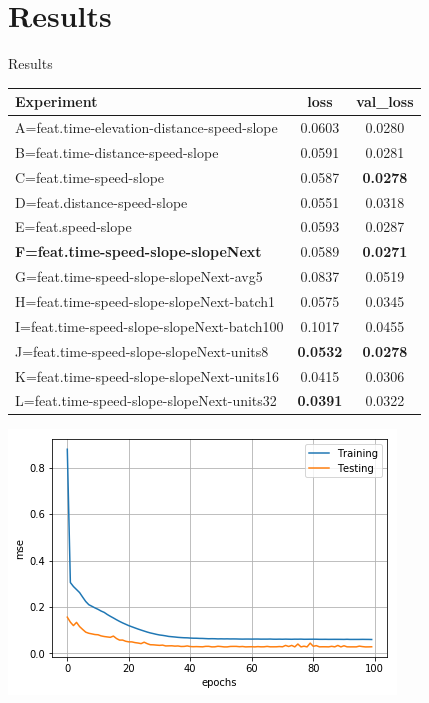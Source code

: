 \documentclass[aspectratio=169]{beamer}
\newcommand{\nologo}{\setbeamertemplate{logo}{}}
\begin{document}
\section{Results}
{\nologo
\begin{frame}{Results}
  \begin{table}[h]
    \begin{center}
      \begin{tabular}{|l||c|c|}
      \hline
      \textbf{Experiment} & \textbf{loss} & \textbf{val\_loss}\\
      \hline
      \hline
      A=feat.time-elevation-distance-speed-slope & 0.0603 & 0.0280\\
      B=feat.time-distance-speed-slope & 0.0591 & 0.0281\\
      C=feat.time-speed-slope & 0.0587 & \textbf{0.0278}\\
      D=feat.distance-speed-slope & 0.0551 & 0.0318\\
      E=feat.speed-slope & 0.0593 & 0.0287\\
      \textbf{F=feat.time-speed-slope-slopeNext} & 0.0589 & \textbf{0.0271}\\
      G=feat.time-speed-slope-slopeNext-avg5 & 0.0837 & 0.0519\\
      H=feat.time-speed-slope-slopeNext-batch1 & 0.0575  & 0.0345\\
      I=feat.time-speed-slope-slopeNext-batch100 & 0.1017 & 0.0455\\
      J=feat.time-speed-slope-slopeNext-units8 & \textbf{0.0532} & \textbf{0.0278}\\
      K=feat.time-speed-slope-slopeNext-units16 & 0.0415 & 0.0306\\
      L=feat.time-speed-slope-slopeNext-units32 & \textbf{0.0391} & 0.0322\\
      \hline
      \end{tabular}
    \end{center}
  \end{table}
\end{frame}
}


\begin{frame}
  \begin{center}
    \includegraphics[scale=0.7]{01_score_feat_time_speed_slope_slopeNext.png}
  \end{center}
\end{frame}
\end{document}
